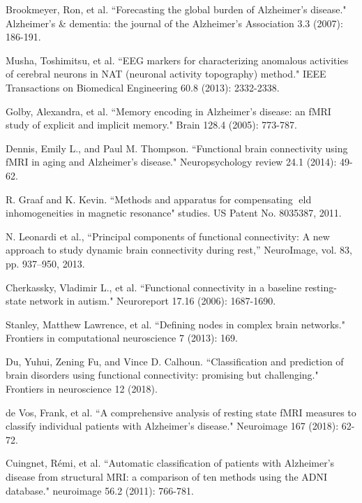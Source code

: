 
	\begin{thebibliography}{1}
		
		
		Brookmeyer, Ron, et al. ``Forecasting the global burden of Alzheimer’s disease." Alzheimer's \& dementia: the journal of the Alzheimer's Association 3.3 (2007): 186-191.
		
		Musha, Toshimitsu, et al. ``EEG markers for characterizing anomalous activities of cerebral neurons in NAT (neuronal activity topography) method." IEEE Transactions on Biomedical Engineering 60.8 (2013): 2332-2338.
		
		Golby, Alexandra, et al. ``Memory encoding in Alzheimer's disease: an fMRI study of explicit and implicit memory." Brain 128.4 (2005): 773-787.
		
		Dennis, Emily L., and Paul M. Thompson. ``Functional brain connectivity using fMRI in aging and Alzheimer’s disease." Neuropsychology review 24.1 (2014): 49-62.
		
		R. Graaf and K. Kevin. ``Methods and apparatus for
		compensating eld inhomogeneities in magnetic resonance"
		studies. US Patent No. 8035387, 2011.
		
		
		N. Leonardi et al., “Principal components of functional connectivity: A
		new approach to study dynamic brain connectivity during rest,” NeuroImage,
		vol. 83, pp. 937–950, 2013.
		
		Cherkassky, Vladimir L., et al. ``Functional connectivity in a baseline resting-state network in autism." Neuroreport 17.16 (2006): 1687-1690.
		
		Stanley, Matthew Lawrence, et al. ``Defining nodes in complex brain networks." Frontiers in computational neuroscience 7 (2013): 169.
		
		Du, Yuhui, Zening Fu, and Vince D. Calhoun. ``Classification and prediction of brain disorders using functional connectivity: promising but challenging." Frontiers in neuroscience 12 (2018).
		
		de Vos, Frank, et al. ``A comprehensive analysis of resting state fMRI measures to classify individual patients with Alzheimer's disease." Neuroimage 167 (2018): 62-72.
		
		Cuingnet, Rémi, et al. ``Automatic classification of patients with Alzheimer's disease from structural MRI: a comparison of ten methods using the ADNI database." neuroimage 56.2 (2011): 766-781.
		

\end{thebibliography}
